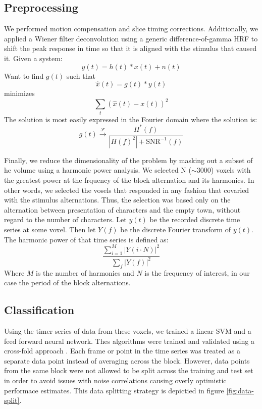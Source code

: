 \documentclass[twocolumn,final]{article}
\begin{document}
\subsection{Preprocessing}
We performed motion compensation and slice timing corrections. 
Additionally, we applied a Wiener filter deconvolution using a generic difference-of-gamma HRF \cite{Boynton1996} to shift the peak response in time so that it is aligned with the stimulus that caused it.
Given a system:
\begin{equation}
y(t) = h(t) \ast x(t) + n(t)
\end{equation}
Want to find $g(t)$ such that 
\begin{equation}
\hat{x}(t) = g(t) \ast y(t)
\end{equation}
minimizes
\begin{equation}
\sum_{t}{\left( \hat{x}(t) - x(t) \right)^{2}}
\end{equation}
The solution is most easily expressed in the Fourier domain where the solution is:
\begin{equation}
g(t) \xrightarrow{\mathcal{F}} \frac{H^{*}(f)}{\left|H(f)^{2}\right| + \mbox{SNR}^{-1}(f)}
\end{equation}

Finally, we reduce the dimensionality of the problem by masking out a subset of he volume using a harmonic power analysis.
We selected N ($\sim$3000) voxels with the greatest power at the frquency of the block alternation and its harmonics.
In other words, we selected the vosels that responded in any fashion that covaried with the stimulus alternations.
Thus, the selection was based only on the alternation between presentation of characters and the empty town, without regard to the number of characters.
Let $y(t)$ be the recorded discrete time series at some voxel.
Then let $Y(f)$ be the discrete Fourier transform of $y(t)$.
The harmonic power of that time series is defined as:
\begin{equation}
\frac{\sum_{i = 1}^{M}{\left|Y(i \cdot N)\right|^{2}}}{\sum_{f}{\left|Y(f)\right|^{2}}}
\end{equation}
Where $M$ is the number of harmonics and $N$ is the frequency of interest, in our case the period of the block alternations.

\subsection{Classification}
Using the timer series of data from these voxels, we trained a linear SVM and a feed forward neural network.
Thes algorithms were trained and validated using a cross-fold approach \cite{Kohavi1995}.
Each frame or point in the time series was treated as a separate data point instead of averaging across the block.
However, data points from the same block were not allowed to be split across the training and test set in order to avoid issues with noise correlations causing overly optimistic performace estimates.
This data splitting strategy is depictied in figure \ref{fig:data-split}.
\end{document}
